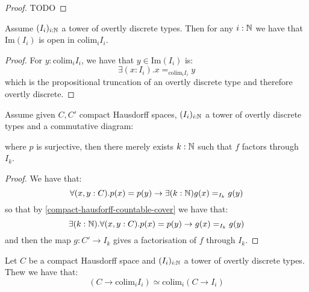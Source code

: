 \begin{proof}
TODO
\end{proof}

\begin{lemma}\label{overtly-discrete-union-open}
Assume $(I_i)_{i:\mathbb{N}}$ a tower of overtly discrete types. Then for any $i:\mathbb{N}$ we have that $\mathrm{Im}(I_i)$ is open in $\mathrm{colim}_i I_i$. 
\end{lemma}

\begin{proof}
For $y:\mathrm{colim}_iI_i$, we have that $y\in \mathrm{Im}(I_i)$ is:
\[\exists(x:I_i). x=_{\mathrm{colim}_iI_i}y\]
which is the propositional truncation of an overtly discrete type and therefore overtly discrete.
\end{proof}

\begin{lemma}\label{factorisation-compact-hausdorff-cover}
Assume given $C,C'$ compact Hausdorff spaces, $(I_i)_{i:\mathbb{N}}$ a tower of overtly discrete types and a commutative diagram:
\begin{center}
\end{center}
where $p$ is surjective, then there merely exists $k:\mathbb{N}$ such that $f$ factors through $I_k$.
\end{lemma}

\begin{proof}
We have that:
\[\forall(x,y:C). p(x)=p(y) \to \exists(k:\mathbb{N}) g(x)=_{I_k}g(y)\]
so that by \cref{compact-hausforff-countable-cover} we have that:
\[\exists(k:\mathbb{N}). \forall(x,y:C). p(x)=p(y) \to g(x)=_{I_k}g(y)\]
and then the map $g:C'\to I_k$ gives a factorisation of $f$ through $I_k$.
\end{proof}

\begin{lemma}\label{scott-continuity-right}
Let $C$ be a compact Hausdorff space and $(I_i)_{i:\mathbb{N}}$ a tower of overtly discrete types. Thew we have that:
\[(C\to \mathrm{colim}_i I_i) \simeq \mathrm{colim}_i (C\to I_i)\]
\end{lemma}


